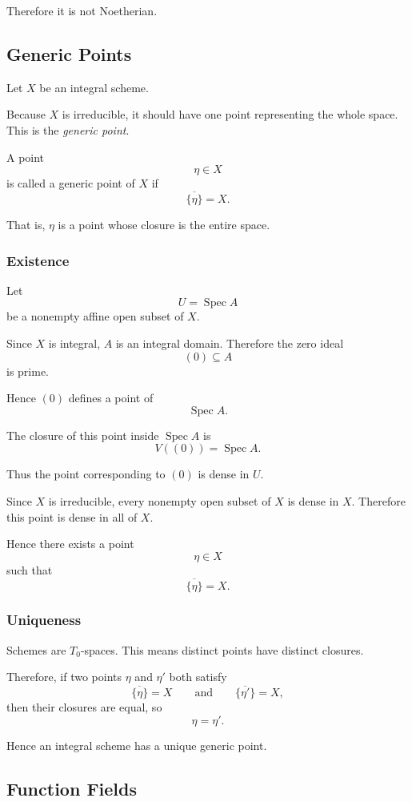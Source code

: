 \documentclass[12pt,a4paper]{article}
\theoremstyle{notespace}
\begin{document}
Therefore it is not Noetherian.

\subsection{Generic Points}

Let \(X\) be an integral scheme.

Because \(X\) is irreducible, it should have one point representing the whole space. This is the \emph{generic point}.

A point
\[
\eta\in X
\]
is called a generic point of \(X\) if
\[
\overline{\{\eta\}}=X.
\]

That is, \(\eta\) is a point whose closure is the entire space.

\subsubsection*{Existence}

Let
\[
U=\operatorname{Spec}A
\]
be a nonempty affine open subset of \(X\).

Since \(X\) is integral, \(A\) is an integral domain. Therefore the zero ideal
\[
(0)\subseteq A
\]
is prime.

Hence \((0)\) defines a point of
\[
\operatorname{Spec}A.
\]

The closure of this point inside \(\operatorname{Spec}A\) is
\[
V((0))=\operatorname{Spec}A.
\]

Thus the point corresponding to \((0)\) is dense in \(U\).

Since \(X\) is irreducible, every nonempty open subset of \(X\) is dense in \(X\). Therefore this point is dense in all of \(X\).

Hence there exists a point
\[
\eta\in X
\]
such that
\[
\overline{\{\eta\}}=X.
\]

\subsubsection*{Uniqueness}

Schemes are \(T_0\)-spaces. This means distinct points have distinct closures.

Therefore, if two points \(\eta\) and \(\eta'\) both satisfy
\[
\overline{\{\eta\}}=X
\qquad\text{and}\qquad
\overline{\{\eta'\}}=X,
\]
then their closures are equal, so
\[
\eta=\eta'.
\]

Hence an integral scheme has a unique generic point.

\subsection{Function Fields}
\end{document}
